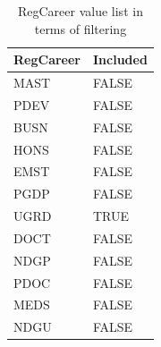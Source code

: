 \begin{table}[]
    \centering
    \caption{RegCareer value list in terms of filtering}
    \label{RegCareerFilter}
    \begin{tabular}{ll}
        RegCareer & Included \\ \hline
        MAST      & FALSE    \\
        PDEV      & FALSE    \\
        BUSN      & FALSE    \\
        HONS      & FALSE    \\
        EMST      & FALSE    \\
        PGDP      & FALSE    \\
        UGRD      & TRUE     \\
        DOCT      & FALSE    \\
        NDGP      & FALSE    \\
        PDOC      & FALSE    \\
        MEDS      & FALSE    \\
        NDGU      & FALSE    \\ \hline
    \end{tabular}
\end{table}


